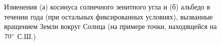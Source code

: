 \documentclass[a4paper, fontsize=14pt]{scrartcl}
\begin{document}
\begin{figure}[h]
    \begin{minipage}[h]{0.49\linewidth}
    \end{minipage}
    \hfill
    \begin{minipage}[h]{0.49\linewidth}
    \end{minipage}
    \caption{Изменения (а) косинуса солнечного зенитного угла и (б) альбедо в течении года (при остальных фиксированных условиях), вызванные вращением Земли вокруг Солнца (на примере точки, находящейся на $70\degree$ С.Ш.)}
    \label{fig:image}
\end{figure}
\end{document}
